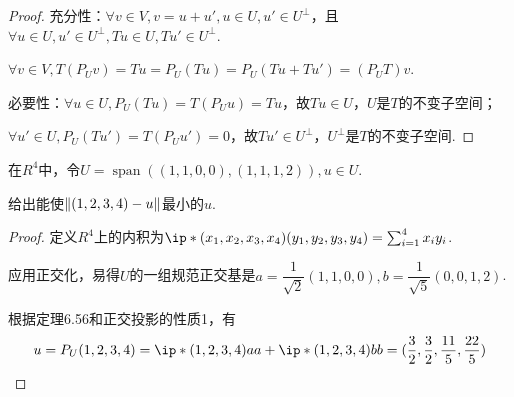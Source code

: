 \begin{proof}
    充分性：\(\forall v \in V,v=u+u',u \in U,u' \in U^\bot\)，且\(\forall u \in U,u' \in U^\bot,Tu \in U,Tu' \in U^\bot\).

    \(\forall v \in V,T(P_U v)=Tu=P_U(Tu)=P_U(Tu+Tu')=(P_U T)v\).
    
    必要性：\(\forall u \in U,P_U(Tu)=T(P_U u)=Tu\)，故\(Tu \in U\)，\(U\)是\(T\)的不变子空间；
    
    \(\forall u' \in U,P_U(Tu')=T(P_U u')=0\)，故\(Tu' \in U^\bot\)，\(U^\bot\)是\(T\)的不变子空间.
\end{proof}

\begin{problem}[11]\label{6.C.11}
    在\(R^4\)中，令\(U=\operatorname{span}((1,1,0,0),(1,1,1,2)),u \in U\).
    
    给出能使\(\norm*{(1,2,3,4)-u}\)最小的\(u\).
\end{problem}

\begin{proof}
    定义\(R^4\)上的内积为\(\ip*{(x_1,x_2,x_3,x_4)}{(y_1,y_2,y_3,y_4)}=\sum_{i=1}^4 x_iy_i\).

    应用正交化，易得\(U\)的一组规范正交基是\(a=\dfrac{1}{\sqrt{2}}(1,1,0,0),b=\dfrac{1}{\sqrt{5}}(0,0,1,2)\).
    
    根据定理6.56和正交投影的性质1，有
    \begin{align*}
        u=P_U(1,2,3,4)=\ip*{(1,2,3,4)}{a}a+\ip*{(1,2,3,4)}{b}b 
        =(\dfrac{3}{2},\dfrac{3}{2},\dfrac{11}{5},\dfrac{22}{5})
    \end{align*}
\end{proof}

